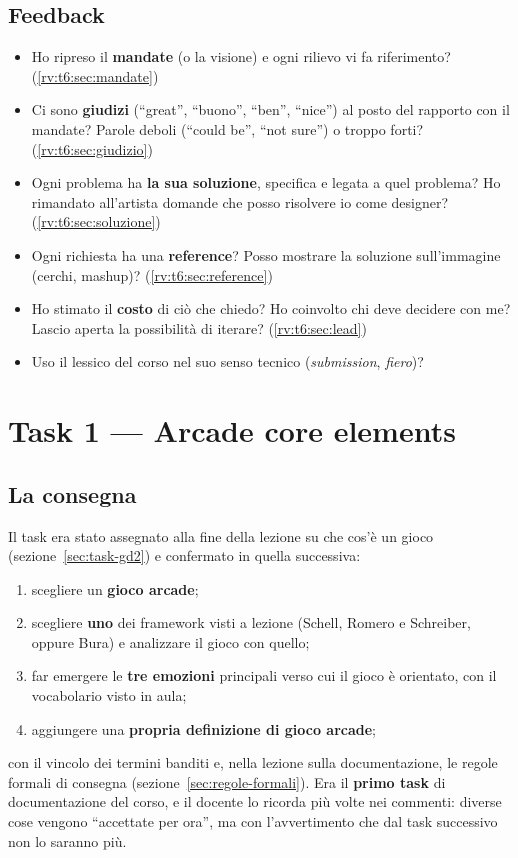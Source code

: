 \subsection{Feedback}
\begin{itemize}
  \item Ho ripreso il \textbf{mandate} (o la visione) e ogni rilievo vi fa
        riferimento? (\ref{rv:t6:sec:mandate})
  \item Ci sono \textbf{giudizi} (``great'', ``buono'', ``ben'', ``nice'')
        al posto del rapporto con il mandate? Parole deboli (``could be'',
        ``not sure'') o troppo forti? (\ref{rv:t6:sec:giudizio})
  \item Ogni problema ha \textbf{la sua soluzione}, specifica e legata a
        quel problema? Ho rimandato all'artista domande che posso
        risolvere io come designer? (\ref{rv:t6:sec:soluzione})
  \item Ogni richiesta ha una \textbf{reference}? Posso mostrare la
        soluzione sull'immagine (cerchi, mashup)?
        (\ref{rv:t6:sec:reference})
  \item Ho stimato il \textbf{costo} di ciò che chiedo? Ho coinvolto chi
        deve decidere con me? Lascio aperta la possibilità di iterare?
        (\ref{rv:t6:sec:lead})
  \item Uso il lessico del corso nel suo senso tecnico (\emph{submission},
        \emph{fiero})?
\end{itemize}

\section{Task 1 --- Arcade core elements}
\label{rv:t1:sec:task}

\subsection{La consegna}

Il task era stato assegnato alla fine della lezione su che cos'è un gioco
(sezione~\ref{sec:task-gd2}) e confermato in quella successiva:
\begin{enumerate}
  \item scegliere un \textbf{gioco arcade};
  \item scegliere \textbf{uno} dei framework visti a lezione (Schell, Romero
        e Schreiber, oppure Bura) e analizzare il gioco con quello;
  \item far emergere le \textbf{tre emozioni} principali verso cui il gioco
        è orientato, con il vocabolario visto in aula;
  \item aggiungere una \textbf{propria definizione di gioco arcade};
\end{enumerate}
con il vincolo dei termini banditi e, nella lezione sulla documentazione,
le regole formali di consegna (sezione~\ref{sec:regole-formali}). Era il
\textbf{primo task} di documentazione del corso, e il docente lo ricorda più
volte nei commenti: diverse cose vengono ``accettate per ora'', ma con
l'avvertimento che dal task successivo non lo saranno più.

